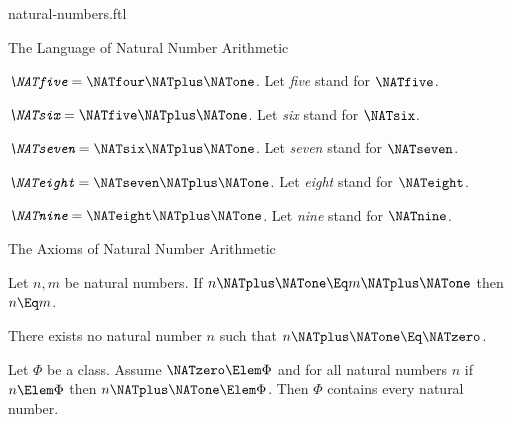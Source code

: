 \documentclass{stex}
\begin{document}
\begin{smodule}{natural-numbers.ftl}
\begin{sfragment}{The Language of Natural Number Arithmetic}
  \begin{definition}[forthel]
    $\emph{\NATfive} = \NATfour \NATplus \NATone$.
    Let \emph{five} stand for $\NATfive$.
  \end{definition}

  \begin{definition}[forthel]
    $\emph{\NATsix} = \NATfive \NATplus \NATone$.
    Let \emph{six} stand for $\NATsix$.
  \end{definition}

  \begin{definition}[forthel]
    $\emph{\NATseven} = \NATsix \NATplus \NATone$.
    Let \emph{seven} stand for $\NATseven$.
  \end{definition}

  \begin{definition}[forthel]
    $\emph{\NATeight} = \NATseven \NATplus \NATone$.
    Let \emph{eight} stand for $\NATeight$.
  \end{definition}

  \begin{definition}[forthel]
    $\emph{\NATnine} = \NATeight \NATplus \NATone$.
    Let \emph{nine} stand for $\NATnine$.
  \end{definition}
\end{sfragment}

\begin{sfragment}{The Axioms of Natural Number Arithmetic}


  \begin{axiom}[forthel,name=injectivity of successor function]
    Let $n, m$ be natural numbers.
    If $n \NATplus \NATone \Eq m \NATplus \NATone$ then $n \Eq m$.
  \end{axiom}

  \begin{axiom}[forthel]
    There exists no natural number $n$ such that $n \NATplus \NATone \Eq \NATzero$.
  \end{axiom}


  \begin{axiom}[forthel,title=Induction,name=induction I]
    Let $\Phi$ be a class.
    Assume $\NATzero \Elem \Phi$ and for all natural numbers $n$ if $n \Elem \Phi$ then
    $n \NATplus \NATone \Elem \Phi$.
    Then $\Phi$ contains every natural number.
  \end{axiom}


\end{sfragment}
\end{smodule}
\end{document}
